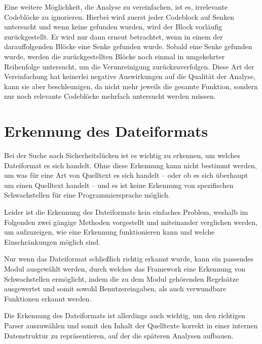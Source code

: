             Eine weitere Möglichkeit,
            die Analyse zu vereinfachen,
            ist es,
            irrelevante Codeblöcke zu ignorieren.
            Hierbei wird zuerst jeder Codeblock auf Senken untersucht und
            wenn keine gefunden wurden,
            wird der Block vorläufig zurückgestellt.
            Er wird nur dann erneut betrachtet,
            wenn in einem der darauffolgenden Blöcke eine Senke gefunden wurde.
            Sobald eine Senke gefunden wurde,
            werden die zurückgestellten Blöcke noch einmal in umgekehrter Reihenfolge untersucht,
            um die Verunreinigung zurückzuverfolgen.
            Diese Art der Vereinfachung hat keinerlei negative Auswirkungen auf die Qualität der Analyse,
            kann sie aber beschleunigen,
            da nicht mehr jeweils die gesamte Funktion,
            sondern nur noch relevante Codeblöcke mehrfach untersucht werden müssen.

    \section{Erkennung des Dateiformats}
        Bei der Suche nach Sicherheitslücken ist es wichtig zu erkennen,
        um welches Dateiformat es sich handelt.
        Ohne diese Erkennung kann nicht bestimmt werden,
        um was für eine Art von Quelltext es sich handelt
        -- oder ob es sich überhaupt um einen Quelltext handelt
        -- und
        es ist keine Erkennung von spezifischen Schwachstellen für eine Programmiersprache möglich.

        Leider ist die Erkennung des Dateiformats kein einfaches Problem,
        weshalb im Folgenden zwei gängige Methoden vorgestellt und
        miteinander verglichen werden,
        um aufzuzeigen,
        wie eine Erkennung funktionieren kann und
        welche Einschränkungen möglich sind.

        Nur wenn das Dateiformat schließlich richtig erkannt wurde,
        kann ein passendes Modul ausgewählt werden,
        durch welches das Framework eine Erkennung von Schwachstellen ermöglicht,
        indem die zu dem Modul gehörenden Regelsätze ausgewertet und
        somit sowohl Benutzereingaben,
        als auch verwundbare Funktionen erkannt werden.

        Die Erkennung des Dateiformats ist allerdings auch wichtig,
        um den richtigen Parser auszuwählen und
        somit den Inhalt der Quelltexte korrekt in einer internen Datenstruktur zu repräsentieren,
        auf der die späteren Analysen aufbauen.

